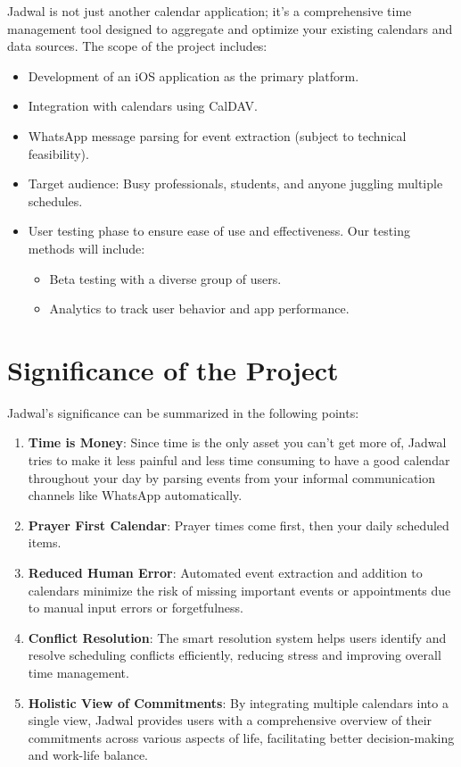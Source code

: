 \documentclass[12pt,a4paper]{report}
\begin{document}
Jadwal is not just another calendar application; it's a comprehensive time management tool designed to aggregate and optimize your existing calendars and data sources. The scope of the project includes:
\begin{itemize}
    \item Development of an iOS application as the primary platform.
    \item Integration with calendars using CalDAV.
    \item WhatsApp message parsing for event extraction (subject to technical feasibility).
    \item Target audience: Busy professionals, students, and anyone juggling multiple schedules.
    \item User testing phase to ensure ease of use and effectiveness. Our testing methods will include:
          \begin{itemize}
              \item Beta testing with a diverse group of users.
              \item Analytics to track user behavior and app performance.
          \end{itemize}
\end{itemize}


\section{Significance of the Project}

Jadwal's significance can be summarized in the following points:
\begin{enumerate}
    \item \textbf{Time is Money}: Since time is the only asset you can't get more of, Jadwal tries to make it less painful and less time consuming to have a good calendar throughout your day by parsing events from your informal communication channels like WhatsApp automatically.
    \item \textbf{Prayer First Calendar}: Prayer times come first, then your daily scheduled items.
    \item \textbf{Reduced Human Error}: Automated event extraction and addition to calendars minimize the risk of missing important events or appointments due to manual input errors or forgetfulness.
    \item \textbf{Conflict Resolution}: The smart resolution system helps users identify and resolve scheduling conflicts efficiently, reducing stress and improving overall time management.
    \item \textbf{Holistic View of Commitments}: By integrating multiple calendars into a single view, Jadwal provides users with a comprehensive overview of their commitments across various aspects of life, facilitating better decision-making and work-life balance.
\end{enumerate}
\end{document}
